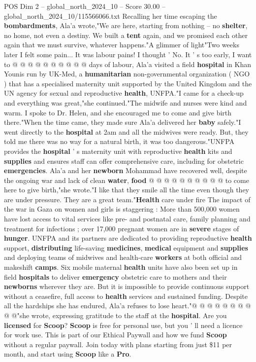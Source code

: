 \begin{textsample}{POS Dim 2 – global\_north\_2024\_10 – Score 30.00 – global\_north\_2024\_10/115566066.txt}
Recalling her time escaping the \textbf{bombardments}, Ala'a wrote,"We are here, starting from nothing -- no \textbf{shelter}, no home, not even a destiny.
We built a \textbf{tent} again, and we promised each other again that we must survive, whatever happens."A glimmer of light"Two weeks later I felt some pain...
It was labour pains!
I thought ' No.
It ' s too early, I want to @ @ @ @ @ @ @ @ @ @ days of labour, Ala'a visited a field \textbf{hospital} in Khan Younis run by UK-Med, a \textbf{humanitarian} non-governmental organization ( NGO ) that has a specialised maternity unit supported by the United Kingdom and the UN agency for sexual and reproductive \textbf{health}, UNFPA."I came for a check-up and everything was great,"she continued."The midwife and nurses were kind and warm.
I spoke to Dr.
Helen, and she encouraged me to come and give birth there."When the time came, they made sure Ala'a delivered her \textbf{baby} safely."I went directly to the \textbf{hospital} at 2am and all the midwives were ready.
But, they told me there was no way for a natural birth, it was too dangerous."UNFPA provides the \textbf{hospital} ' s maternity unit with reproductive \textbf{health} kits and \textbf{supplies} and ensures staff can offer comprehensive care, including for obstetric \textbf{emergencies}.
Ala'a and her \textbf{newborn} Mohammad have recovered well, despite the ongoing war and lack of clean \textbf{water}, \textbf{food} @ @ @ @ @ @ @ @ @ @ to come here to give birth,"she wrote."I like that they smile all the time even though they are under pressure.
They are a great team."\textbf{Health} care under fire The impact of the war in Gaza on women and girls is staggering : More than 500,000 women have lost access to vital services like pre- and postnatal care, family planning and treatment for infections ; over 17,000 pregnant women are in \textbf{severe} stages of \textbf{hunger}.
UNFPA and its partners are dedicated to providing reproductive \textbf{health} support, \textbf{distributing} life-saving \textbf{medicines}, \textbf{medical} equipment and \textbf{supplies} and deploying teams of midwives and health-care \textbf{workers} at both official and makeshift \textbf{camps}.
Six mobile maternal \textbf{health} units have also been set up in field \textbf{hospitals} to deliver \textbf{emergency} obstetric care to mothers and their \textbf{newborns} wherever they are.
But it is impossible to provide continuous support without a ceasefire, full access to \textbf{health} services and sustained funding.
Despite all the hardships she has endured, Ala'a refuses to lose heart."@ @ @ @ @ @ @ @ @ @"she wrote, expressing gratitude to the staff at the \textbf{hospital}.
Are you \textbf{licensed} for \textbf{Scoop}? \textbf{Scoop} is free for personal use, but you ' ll need a licence for work use.
This is part of our Ethical Paywall and how we fund \textbf{Scoop} without a regular paywall.
Join today with plans starting from just \$11 per month, and start using \textbf{Scoop} like a \textbf{Pro}.


\end{textsample}
